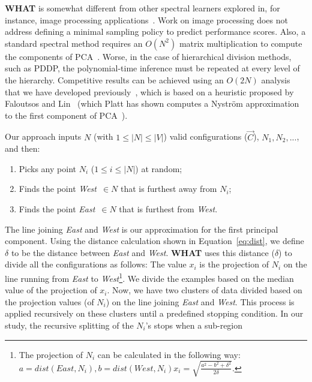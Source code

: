\documentclass{newsig}
\newcommand{\what}{{\bf WHAT }}
\begin{document}
\what is somewhat different from other spectral
learners explored in, for instance, image processing applications~\cite{shi00}.
Work on image processing does not address
defining a minimal sampling policy to predict performance scores.
Also, a standard spectral method requires an $O(N^2)$ matrix multiplication to compute the components
of PCA~\cite{ilin10}. Worse, in the case of hierarchical division methods, such as PDDP,
the polynomial-time inference must be repeated at every level of the hierarchy.
Competitive results can be achieved
using an $O(2N)$ analysis that we have developed previously~\cite{me12d}, which is  based on  a heuristic proposed by Faloutsos and Lin~\cite{Faloutsos1995} (which Platt has shown computes a Nystr\"om approximation to the first component of PCA~\cite{platt05}).

Our approach inputs $N$ (with $1\leq \left\vert{N}\right\vert\leq \left\vert{V}\right\vert$)
valid configurations ($\vec{C}$), $N_1,N_2,...$, and then:
\begin{enumerate}
\item
Picks any
point $N_i$ ($1\leq i \leq\left\vert{N}\right\vert$) at random;
\item
Finds
 the point  {\em West}~$\in N$ that is
furthest away from $N_i$;
\item Finds the point {\em East}~$\in N$
that is furthest from {\em West}.
\end{enumerate}
The line joining {\em East}
and {\em West} is our approximation for the first principal component.
Using the distance calculation shown in Equation~\ref{eq:dist}, 
we define $\delta$ to be the distance between {\em East}
and {\em West}. 
\what uses this distance ($\delta$) to divide all the configurations as follows:
The value $x_i$ is the projection of $N_i$
on the line  running  from {\em East} to {\em West}\footnote{The projection of $N_i$ can be calculated in the following way: $a = \mathit{dist}(\mathit{East}, N_i), b = \mathit{dist}(\mathit{West}, N_i) x_i = \sqrt{\frac{a^2 - b^2 + \delta^2}{2\delta}}$.
}.  We divide
the examples based on the median value of the projection of $x_i$. Now, we have two clusters of data divided based on the projection values (of $N_i$) on the line joining {\em East} and {\em West}. This process is applied recursively on these clusters until a predefined stopping condition. In our study, the  recursive splitting of the $N_i$'s stops when a sub-region
\end{document}
